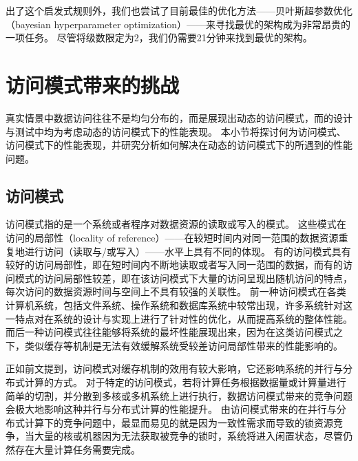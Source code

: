 出了这个启发式规则外，我们也尝试了目前最佳的优化方法{------}贝叶斯超参数优化（bayesian hyperparameter optimization）{------}来寻找最优的{\li}架构成为非常昂贵的一项任务。
尽管将级数限定为2，我们仍需要21分钟来找到最优的架构。


\section{访问模式带来的挑战}

真实情景中数据访问往往不是均匀分布的，而是展现出动态的访问模式，而{\li}的设计与测试中均为考虑动态的访问模式下的性能表现。
本小节将探讨何为访问模式、访问模式下{\li}的性能表现，并研究分析如何解决{\li}在动态的访问模式下的所遇到的性能问题。

\subsection{访问模式}

访问模式指的是一个系统或者程序对数据资源的读取或写入的模式。
这些模式在访问的局部性（locality of reference）{------}在较短时间内对同一范围的数据资源重复地进行访问（读取与/或写入）{------}水平上具有不同的体现。
有的访问模式具有较好的访问局部性，即在短时间内不断地读取或者写入同一范围的数据，而有的访问模式的访问局部性较差，即在该访问模式下大量的访问呈现出随机访问的特点，
每次访问的数据资源时间与空间上不具有较强的关联性。
前一种访问模式在各类计算机系统，包括文件系统、操作系统和数据库系统中较常出现，许多系统针对这一特点对在系统的设计与实现上进行了针对性的优化，从而提高系统的整体性能。
而后一种访问模式往往能够将系统的最坏性能展现出来，因为在这类访问模式之下，类似缓存等机制是无法有效缓解系统受较差访问局部性带来的性能影响的。

正如前文提到，访问模式对缓存机制的效用有较大影响，它还影响系统的并行与分布式计算的方式。
对于特定的访问模式，若将计算任务根据数据量或计算量进行简单的切割，并分散到多核或多机系统上进行执行，数据访问模式带来的竞争问题会极大地影响这种并行与分布式计算的性能提升。
由访问模式带来的在并行与分布式计算下的竞争问题中，最显而易见的就是因为一致性需求而导致的锁资源竞争，当大量的核或机器因为无法获取被竞争的锁时，系统将进入闲置状态，尽管仍然存在大量计算任务需要完成。

